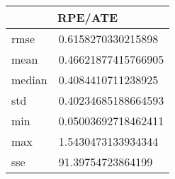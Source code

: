 \begin{table}[!ht] 
 \centering 
 \begin{tabular}{|l|l|} \hline 
 \multicolumn{2}{|c|}{RPE/ATE} \\ \hline 
 rmse & 0.6158270330215898 \\ \hline 
mean & 0.46621877415766905 \\ \hline 
median & 0.4084410711238925 \\ \hline 
std & 0.40234685188664593 \\ \hline 
min & 0.05003692718462411 \\ \hline 
max & 1.5430473133934344 \\ \hline 
sse & 91.39754723864199 \\ \hline 
\end{tabular} 
 \end{table}